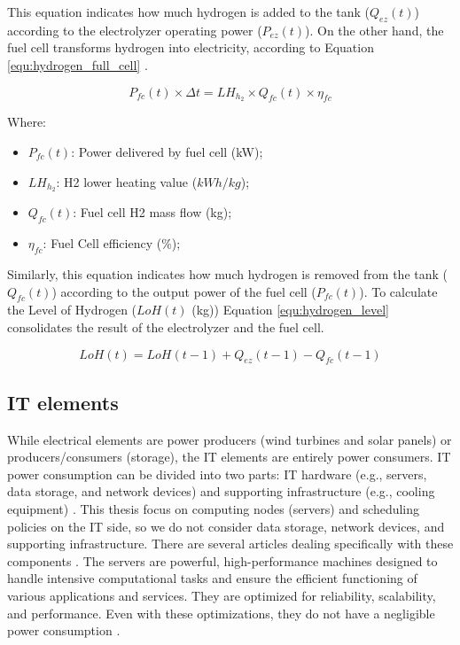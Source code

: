 This equation indicates how much hydrogen is added to the tank ($Q_{ez}(t)$) according to the electrolyzer operating power ($P_{ez}(t)$). On the other hand, the fuel cell transforms hydrogen into electricity, according to Equation \ref{equ:hydrogen_full_cell} \cite{haddad2019mixed}.

\begin{equation}
    \label{equ:hydrogen_full_cell}
    P_{fc}(t) \times \Delta t = LH_{h_{2}} \times Q_{fc}(t) \times \eta_{fc}
\end{equation}

Where:
\begin{itemize}
    \item $P_{fc}(t)$: Power delivered by fuel cell (kW);
    \item $LH_{h_{2}}$: H2 lower heating value ($kWh / kg$);
    \item $Q_{fc}(t)$: Fuel cell H2 mass flow (kg);
    \item $\eta_{fc}$: Fuel Cell efficiency (\%);
\end{itemize}

Similarly, this equation indicates how much hydrogen is removed from the tank ($Q_{fc}(t)$) according to the output power of the fuel cell ($P_{fc}(t)$). To calculate the Level of Hydrogen ($LoH(t)$ (kg)) Equation \ref{equ:hydrogen_level} consolidates the result of the electrolyzer and the fuel cell.

\begin{equation}
    \label{equ:hydrogen_level}
    LoH(t) = LoH(t-1) + Q_{ez}(t-1) - Q_{fc}(t-1)
\end{equation}

\subsection{IT elements}
\label{sec:related_work_it_elements}
While electrical elements are power producers (wind turbines and solar panels) or producers/consumers (storage), the IT elements are entirely power consumers. IT power consumption can be divided into two parts: IT hardware (e.g., servers, data storage, and network devices) and supporting infrastructure (e.g., cooling equipment) \cite{centres2022data, dayarathna2015data}. This thesis focus on computing nodes (servers) and scheduling policies on the IT side, so we do not consider data storage, network devices, and supporting infrastructure. There are several articles dealing specifically with these components \cite{dayarathna2015data, orgerie2014survey, zhang2021survey, hammadi2014survey}. The servers are powerful, high-performance machines designed to handle intensive computational tasks and ensure the efficient functioning of various applications and services. They are optimized for reliability, scalability, and performance. Even with these optimizations, they do not have a negligible power consumption \cite{ismail2020computing, orgerie2014survey}.

